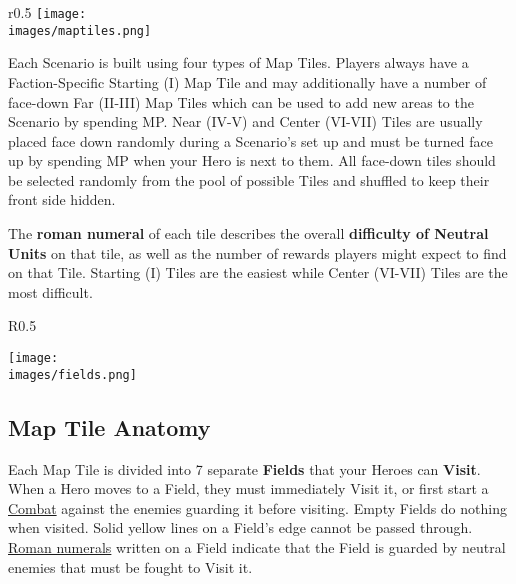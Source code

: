 
\bigskip

\begin{wrapfigure}{r}{0.5\textwidth}
  \texttt{[image: \\images/maptiles.png]}
\end{wrapfigure}
Each Scenario is built using four types of Map Tiles.
Players always have a Faction-Specific Starting (I) Map Tile and may additionally have a number of face-down Far (II-III) Map Tiles which can be used to add new areas to the Scenario by spending MP.
Near (IV-V) and Center (VI-VII) Tiles are usually placed face down randomly during a Scenario’s set up and must be turned face up by spending MP when your Hero is next to them.
All face-down tiles should be selected randomly from the pool of possible Tiles and shuffled to keep their front side hidden.\par
The \textbf{roman numeral} of each tile describes the overall \textbf{difficulty of Neutral Units} on that tile, as well as the number of rewards players might expect to find on that Tile.
Starting (I) Tiles are the easiest while Center (VI-VII) Tiles are the most difficult.\par
\par

\begin{wrapfigure}{R}{0.5\textwidth}
  \begin{center}
  \texttt{[image: \\images/fields.png]}
  \end{center}
\end{wrapfigure}
\subsection*{Map Tile Anatomy}
Each Map Tile is divided into 7 separate \textbf{Fields} that your Heroes can \textbf{Visit}.
When a Hero moves to a Field, they must immediately Visit it, or
first start a \hyperlink{Combat}{Combat} against the enemies guarding it before visiting.
Empty Fields do nothing when visited.
Solid yellow lines on a Field's edge cannot be passed through.
\hyperlink{Difficulty}{Roman numerals} written on a Field indicate that the Field is guarded by neutral enemies that must be fought to Visit it.\par

\clearpage

